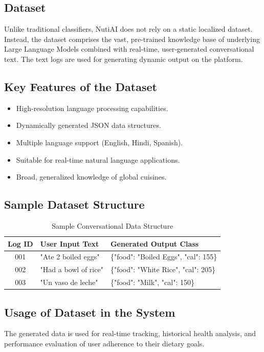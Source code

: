 \documentclass[12pt,a4paper]{report}
\begin{document}
\subsection{Dataset}
Unlike traditional classifiers, NutiAI does not rely on a static localized dataset. Instead, the dataset comprises the vast, pre-trained knowledge base of underlying Large Language Models combined with real-time, user-generated conversational text. The text logs are used for generating dynamic output on the platform.

\subsection{Key Features of the Dataset}
\begin{itemize}[leftmargin=*]
    \item High-resolution language processing capabilities.
    \item Dynamically generated JSON data structures.
    \item Multiple language support (English, Hindi, Spanish).
    \item Suitable for real-time natural language applications.
    \item Broad, generalized knowledge of global cuisines.
\end{itemize}

\subsection{Sample Dataset Structure}
\begin{table}[H]
\centering
\begin{tabular}{|c|l|l|}
\hline
\textbf{Log ID} & \textbf{User Input Text} & \textbf{Generated Output Class} \\ \hline
001 & "Ate 2 boiled eggs" & \{"food": "Boiled Eggs", "cal": 155\} \\ \hline
002 & "Had a bowl of rice" & \{"food": "White Rice", "cal": 205\} \\ \hline
003 & "Un vaso de leche" & \{"food": "Milk", "cal": 150\} \\ \hline
\end{tabular}
\caption{Sample Conversational Data Structure}
\end{table}

\subsection{Usage of Dataset in the System}
The generated data is used for real-time tracking, historical health analysis, and performance evaluation of user adherence to their dietary goals.
\end{document}
